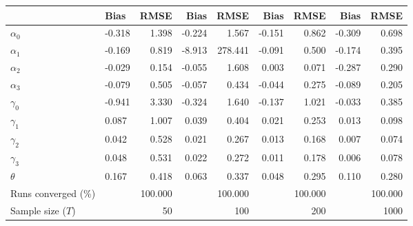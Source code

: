 
\begin{tabular}[t]{llrrrrrrr}
\toprule
  & Bias & RMSE & Bias & RMSE & Bias & RMSE & Bias & RMSE\\
\midrule
$\alpha_{0}$ & -0.318 & 1.398 & -0.224 & 1.567 & -0.151 & 0.862 & -0.309 & 0.698\\
$\alpha_{1}$ & -0.169 & 0.819 & -8.913 & 278.441 & -0.091 & 0.500 & -0.174 & 0.395\\
$\alpha_{2}$ & -0.029 & 0.154 & -0.055 & 1.608 & 0.003 & 0.071 & -0.287 & 0.290\\
$\alpha_{3}$ & -0.079 & 0.505 & -0.057 & 0.434 & -0.044 & 0.275 & -0.089 & 0.205\\
$\gamma_{0}$ & -0.941 & 3.330 & -0.324 & 1.640 & -0.137 & 1.021 & -0.033 & 0.385\\
$\gamma_{1}$ & 0.087 & 1.007 & 0.039 & 0.404 & 0.021 & 0.253 & 0.013 & 0.098\\
$\gamma_{2}$ & 0.042 & 0.528 & 0.021 & 0.267 & 0.013 & 0.168 & 0.007 & 0.074\\
$\gamma_{3}$ & 0.048 & 0.531 & 0.022 & 0.272 & 0.011 & 0.178 & 0.006 & 0.078\\
$\theta$ & 0.167 & 0.418 & 0.063 & 0.337 & 0.048 & 0.295 & 0.110 & 0.280\\
Runs converged (\%) &  & 100.000 &  & 100.000 &  & 100.000 &  & 100.000\\
Sample size ($T$) &  & 50 &  & 100 &  & 200 &  & 1000\\
\bottomrule
\end{tabular}

